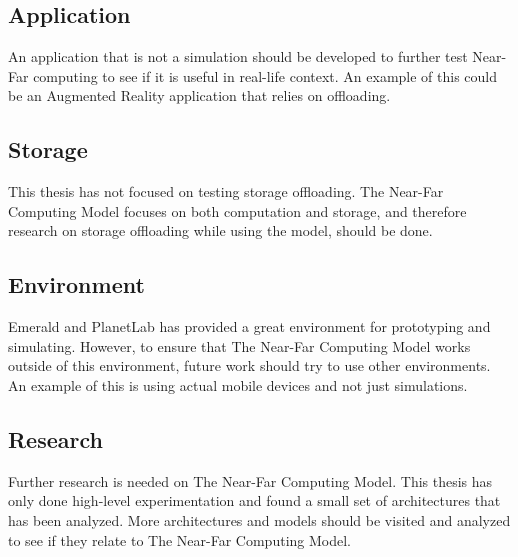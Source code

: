 \subsection{Application}
An application that is not a simulation should be developed to further test Near-Far computing to see if it is useful in real-life context. An example of this could be an Augmented Reality application that relies on offloading. 

\subsection{Storage}
This thesis has not focused on testing storage offloading. The Near-Far Computing Model focuses on both computation and storage, and therefore research on storage offloading while using the model, should be done.

\subsection{Environment}
Emerald and PlanetLab has provided a great environment for prototyping and simulating. However, to ensure that The Near-Far Computing Model works outside of this environment, future work should try to use other environments. An example of this is using actual mobile devices and not just simulations.

\subsection{Research}
Further research is needed on The Near-Far Computing Model. This thesis has only done high-level experimentation and found a small set of architectures that has been analyzed. More architectures and models should be visited and analyzed to see if they relate to The Near-Far Computing Model.


